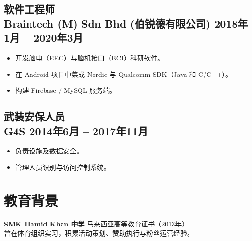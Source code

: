 \documentclass[11pt,a4paper]{article}
\begin{document}
\subsection*{软件工程师 \\ Braintech (M) Sdn Bhd (伯锐德有限公司) \hfill 2018年1月 -- 2020年3月}
\begin{itemize}[leftmargin=1.5em]
    \item 开发脑电（EEG）与脑机接口（BCI）科研软件。
    \item 在 Android 项目中集成 Nordic 与 Qualcomm SDK（Java 和 C/C++）。
    \item 构建 Firebase / MySQL 服务端。
\end{itemize}

\subsection*{武装安保人员 \\ G4S \hfill 2014年6月 -- 2017年11月}
\begin{itemize}[leftmargin=1.5em]
    \item 负责设施及数据安全。
    \item 管理人员识别与访问控制系统。
\end{itemize}

\section*{教育背景}
\textbf{SMK Hamid Khan 中学} \hfill 马来西亚高等教育证书（2013年） \\
曾在体育组织实习，积累活动策划、赞助执行与粉丝运营经验。
\end{document}

